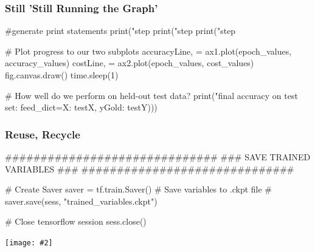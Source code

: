 \documentclass[14pt]{beamer}
\newcommand {\framedgraphic}[2] { %
    \begin{frame}{#1}
        \begin{center}
            \texttt{[image: \#2]}
        \end{center}
    \end{frame}
}
\begin{document}
\begin{frame}[fragile]
  \frametitle{Still 'Still Running the Graph'}
  \begin{python}
            #generate print statements
            print("step %
            print("step %
            print("step %

            # Plot progress to our two subplots
            accuracyLine, = ax1.plot(epoch_values, accuracy_values)
            costLine, = ax2.plot(epoch_values, cost_values)
            fig.canvas.draw()
            time.sleep(1)


# How well do we perform on held-out test data?
print("final accuracy on test set: %
                                                 feed_dict={X: testX, 
                                                        yGold: testY})))
  \end{python}
\end{frame}

\begin{frame}[fragile]
  \frametitle{Reuse, Recycle}
  \begin{python}
##############################
### SAVE TRAINED VARIABLES ###
##############################

# Create Saver
saver = tf.train.Saver()
# Save variables to .ckpt file
# saver.save(sess, "trained_variables.ckpt")

# Close tensorflow session
sess.close()
  \end{python}
\end{frame}

\framedgraphic{}{thats-all-folks.jpg}
\end{document}
